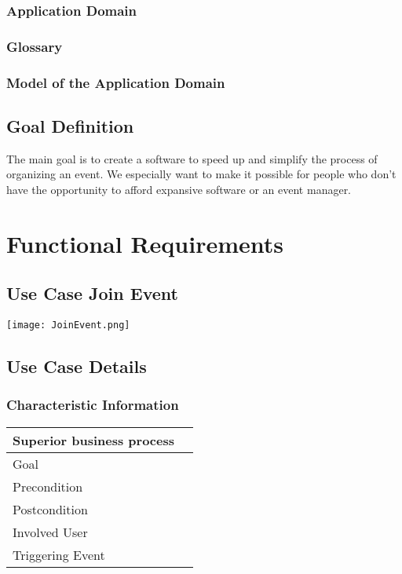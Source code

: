 \documentclass[12pt]{article}
\theoremstyle{definition}
\begin{document}
\subsubsection{Application Domain}



\subsubsection{Glossary}

\subsubsection{Model of the Application Domain}

\subsection{Goal Definition}
The main goal is to create a software to speed up and simplify the process of organizing an event. We especially want to make it possible for people who don't have the opportunity to afford expansive software or an event manager.
\pagebreak

\section{Functional Requirements}

\subsection{Use Case Join Event}

\texttt{[image: JoinEvent.png]}

\subsection{Use Case Details}

\subsubsection{Characteristic Information}

\begin{tabular}{|l|l|}
\hline
Superior business process &  \\ \hline
Goal &  \\ \hline
Precondition &  \\ \hline
Postcondition &  \\ \hline
Involved User &  \\ \hline
Triggering Event &  \\ \hline
\end{tabular}
\end{document}
